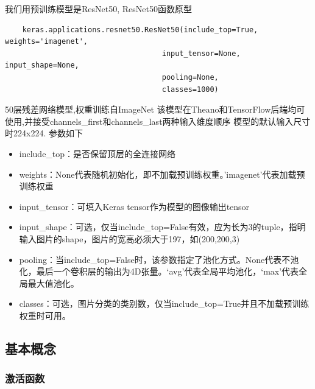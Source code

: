 我们用预训练模型是ResNet50,
    ResNet50函数原型
\begin{verbatim}
    keras.applications.resnet50.ResNet50(include_top=True, weights='imagenet',
                                    input_tensor=None, input_shape=None,
                                    pooling=None,
                                    classes=1000)
\end{verbatim}

    50层残差网络模型,权重训练自ImageNet
    该模型在Theano和TensorFlow后端均可使用,并接受channels\_first和channels\_last两种输入维度顺序
    模型的默认输入尺寸时224x224. 参数如下
    \begin{itemize}

        \item  include\_top：是否保留顶层的全连接网络
        \item  weights：None代表随机初始化，即不加载预训练权重。'imagenet'代表加载预训练权重
        \item  input\_tensor：可填入Keras tensor作为模型的图像输出tensor
        \item  input\_shape：可选，仅当include\_top=False有效，应为长为3的tuple，指明输入图片的shape，图片的宽高必须大于197，如(200,200,3)
        \item  pooling：当include\_top=False时，该参数指定了池化方式。None代表不池化，最后一个卷积层的输出为4D张量。‘avg’代表全局平均池化，‘max’代表全局最大值池化。
        \item  classes：可选，图片分类的类别数，仅当include\_top=True并且不加载预训练权重时可用。
    \end{itemize}

\subsection{基本概念}


\subsubsection{激活函数}

